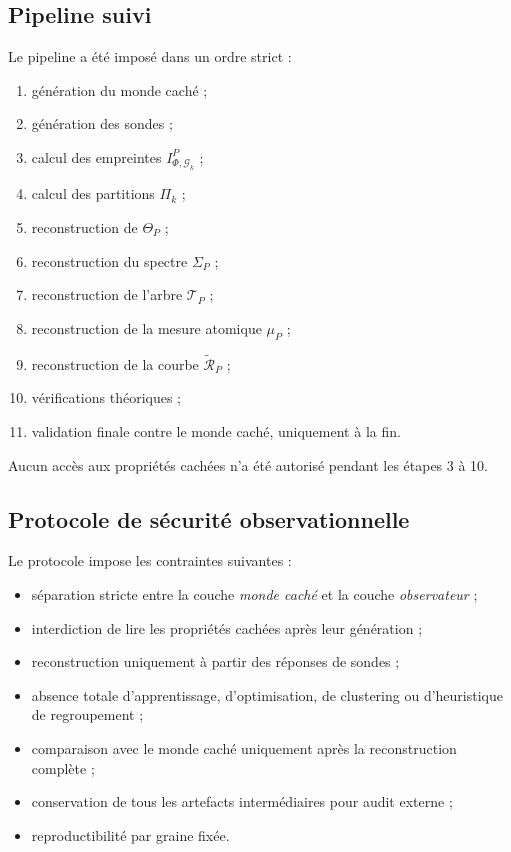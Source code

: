 \documentclass[11pt,a4paper,openany]{book}
\begin{document}
\subsection{Pipeline suivi}

Le pipeline a été imposé dans un ordre strict :

\begin{enumerate}
\item génération du monde caché ;
\item génération des sondes ;
\item calcul des empreintes \(I_{\Phi,\mathcal G_k}^P\) ;
\item calcul des partitions \(\Pi_k\) ;
\item reconstruction de \(\Theta_P\) ;
\item reconstruction du spectre \(\Sigma_P\) ;
\item reconstruction de l'arbre \(\mathcal T_P\) ;
\item reconstruction de la mesure atomique \(\mu_P\) ;
\item reconstruction de la courbe \(\widetilde{\mathcal R}_P\) ;
\item vérifications théoriques ;
\item validation finale contre le monde caché, uniquement à la fin.
\end{enumerate}

Aucun accès aux propriétés cachées n'a été autorisé pendant les étapes 3 à 10.

\subsection{Protocole de sécurité observationnelle}

Le protocole impose les contraintes suivantes :

\begin{itemize}[leftmargin=1.4em]
\item séparation stricte entre la couche \emph{monde caché} et la couche \emph{observateur} ;
\item interdiction de lire les propriétés cachées après leur génération ;
\item reconstruction uniquement à partir des réponses de sondes ;
\item absence totale d'apprentissage, d'optimisation, de clustering ou d'heuristique de regroupement ;
\item comparaison avec le monde caché uniquement après la reconstruction complète ;
\item conservation de tous les artefacts intermédiaires pour audit externe ;
\item reproductibilité par graine fixée.
\end{itemize}
\end{document}
